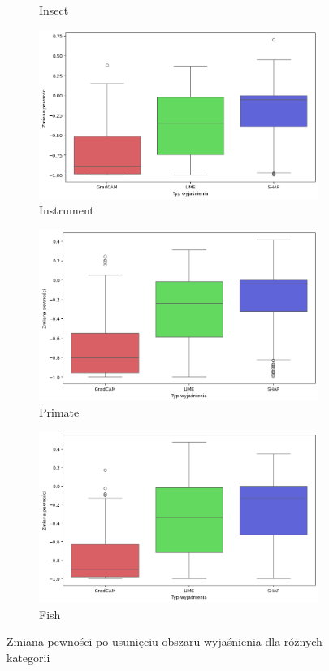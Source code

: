 \begin{figure}[h]
\begin{subfigure}[b]{0.3\textwidth}
		\caption{Insect}  \label{rys:base_confidence_no_exp_insect}
	\end{subfigure}
	\begin{subfigure}[b]{0.3\textwidth}
		\centering\includegraphics[width=.9\textwidth]{img/base_confidence_no_exp_music}
		\caption{Instrument}  \label{rys:base_confidence_no_exp_music}
	\end{subfigure}
	\begin{subfigure}[b]{0.3\textwidth}
		\centering\includegraphics[width=.9\textwidth]{img/base_confidence_no_exp_primate}
		\caption{Primate}  \label{rys:base_confidence_no_exp_primate}
	\end{subfigure}
	\begin{subfigure}[b]{0.3\textwidth}
		\centering\includegraphics[width=.9\textwidth]{img/base_confidence_no_exp_fish}
		\caption{Fish}  \label{rys:base_confidence_no_exp_fish}
	\end{subfigure}
	\caption{Zmiana pewności po usunięciu obszaru wyjaśnienia dla różnych kategorii}
	\label{rys:category_confidence_no_exp}
\end{figure}

